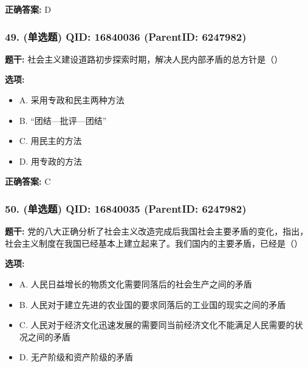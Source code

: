 \documentclass[12pt,UTF8]{ctexart}
\begin{document}
\textbf{正确答案:}
D

\vspace{0.3em}\hrulefill\vspace{0.7em}

\subsubsection*{49. (单选题) \small QID: 16840036 (ParentID: 6247982)}

\textbf{题干:}
社会主义建设道路初步探索时期，解决人民内部矛盾的总方针是（）



\textbf{选项:}
\begin{itemize}[leftmargin=*]

  \item A. 采用专政和民主两种方法

  \item B. “团结—批评—团结”

  \item C. 用民主的方法

  \item D. 用专政的方法

\end{itemize}

\textbf{正确答案:}
C

\vspace{0.3em}\hrulefill\vspace{0.7em}

\subsubsection*{50. (单选题) \small QID: 16840035 (ParentID: 6247982)}

\textbf{题干:}
党的八大正确分析了社会主义改造完成后我国社会主要矛盾的变化，指出，社会主义制度在我国已经基本上建立起来了。我们国内的主要矛盾，已经是（）



\textbf{选项:}
\begin{itemize}[leftmargin=*]

  \item A. 人民日益增长的物质文化需要同落后的社会生产之间的矛盾

  \item B. 人民对于建立先进的农业国的要求同落后的工业国的现实之间的矛盾

  \item C. 人民对于经济文化迅速发展的需要同当前经济文化不能满足人民需要的状况之间的矛盾

  \item D. 无产阶级和资产阶级的矛盾

\end{itemize}
\end{document}
